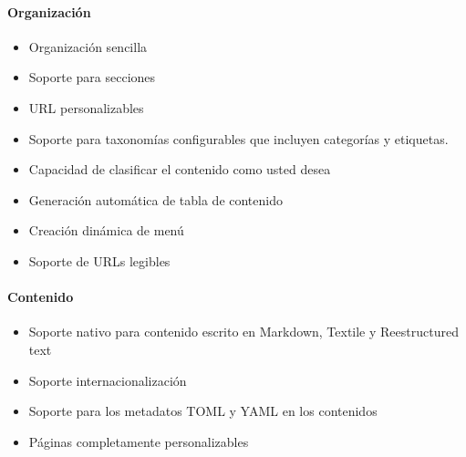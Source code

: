 \paragraph{Organización}

\begin{itemize}
\item Organización sencilla
\item Soporte para secciones
\item URL personalizables
\item Soporte para taxonomías configurables que incluyen categorías y etiquetas.
\item Capacidad de clasificar el contenido como usted desea
\item Generación automática de tabla de contenido
\item Creación dinámica de menú
\item Soporte de URLs legibles
\end{itemize}

\paragraph{Contenido}

\begin{itemize}
\item Soporte nativo para contenido escrito en Markdown, Textile y Reestructured text
\item Soporte internacionalización
\item Soporte para los metadatos TOML y YAML en los contenidos
\item Páginas completamente personalizables
\end{itemize}
